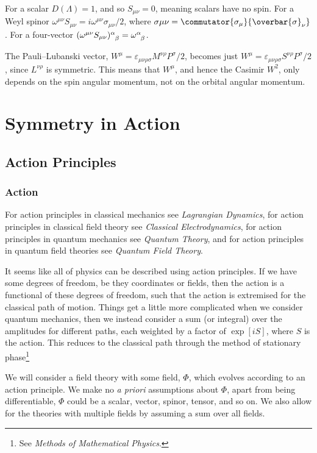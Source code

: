 \documentclass[fleqn]{NotesClass}
\newcommand{\course}[1]{\textit{#1}}
\begin{document}
    For a scalar \(D(\Lambda) = 1\), and so \(S_{\mu\nu} = 0\), meaning scalars have no spin.
    For a Weyl spinor \(\omega^{\mu\nu}S_{\mu\nu} = i\omega^{\mu\nu}\sigma_{\mu\nu}/2\), where \(\sigma{\mu\nu} = \commutator{\sigma_\mu}{\overbar{\sigma}_\nu}\).
    For a four-vector \(\tensor{(\omega^{\mu\nu}S_{\mu\nu})}{^\alpha_\beta} = \tensor{\omega}{^\alpha_\beta}\).
    
    The Pauli--Lubanski vector, \(W^\mu = \varepsilon_{\mu\nu\rho\sigma} M^{\nu\rho}P^\sigma/2\), becomes just \(W^\mu = \varepsilon_{\mu\nu\rho\sigma}S^{\nu\rho}P^\sigma/2\), since \(L^{\nu\rho}\) is symmetric.
    This means that \(W^{\mu}\), and hence the Casimir \(W^2\), only depends on the spin angular momentum, not on the orbital angular momentum.
    
    \part{Symmetry in Action}
    \chapter{Action Principles}
    \section{Action}
    \begin{rmk}
        For action principles in classical mechanics see \course{Lagrangian Dynamics}, for action principles in classical field theory see \course{Classical Electrodynamics}, for action principles in quantum mechanics see \course{Quantum Theory}, and for action principles in quantum field theories see \course{Quantum Field Theory}.
    \end{rmk}
    It seems like all of physics can be described using action principles.
    If we have some degrees of freedom, be they coordinates or fields, then the action is a functional of these degrees of freedom, such that the action is extremised for the classical path of motion.
    Things get a little more complicated when we consider quantum mechanics, then we instead consider a sum (or integral) over the amplitudes for different paths, each weighted by a factor of \(\exp[i S]\), where \(S\) is the action.
    This reduces to the classical path through the method of stationary phase\footnote{See \course{Methods of Mathematical Physics}.}
    
    We will consider a field theory with some field, \(\Phi\), which evolves according to an action principle.
    We make no \textit{a priori} assumptions about \(\Phi\), apart from being differentiable, \(\Phi\) could be a scalar, vector, spinor, tensor, and so on.
    We also allow for the theories with multiple fields by assuming a sum over all fields.
    
\end{document}
